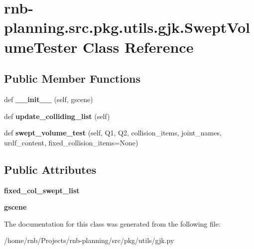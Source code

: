 \hypertarget{classrnb-planning_1_1src_1_1pkg_1_1utils_1_1gjk_1_1_swept_volume_tester}{}\section{rnb-\/planning.src.\+pkg.\+utils.\+gjk.\+Swept\+Volume\+Tester Class Reference}
\label{classrnb-planning_1_1src_1_1pkg_1_1utils_1_1gjk_1_1_swept_volume_tester}
\subsection*{Public Member Functions}
\begin{DoxyCompactItemize}
\item 
\mbox{\label{classrnb-planning_1_1src_1_1pkg_1_1utils_1_1gjk_1_1_swept_volume_tester_a6bcd39308ffeb36252c4067e192904e7}} 
def {\bfseries \+\_\+\+\_\+init\+\_\+\+\_\+} (self, gscene)
\item 
\mbox{\label{classrnb-planning_1_1src_1_1pkg_1_1utils_1_1gjk_1_1_swept_volume_tester_a9520fd8aa5183f2dc9afa0b8346349de}} 
def {\bfseries update\+\_\+colliding\+\_\+list} (self)
\item 
\mbox{\label{classrnb-planning_1_1src_1_1pkg_1_1utils_1_1gjk_1_1_swept_volume_tester_a3005e61846042c64531238e2b8476693}} 
def {\bfseries swept\+\_\+volume\+\_\+test} (self, Q1, Q2, collision\+\_\+items, joint\+\_\+names, urdf\+\_\+content, fixed\+\_\+collision\+\_\+items=None)
\end{DoxyCompactItemize}
\subsection*{Public Attributes}
\begin{DoxyCompactItemize}
\item 
\mbox{\label{classrnb-planning_1_1src_1_1pkg_1_1utils_1_1gjk_1_1_swept_volume_tester_a99333f9afc714ad6f7aecd1680269b8c}} 
{\bfseries fixed\+\_\+col\+\_\+swept\+\_\+list}
\item 
\mbox{\label{classrnb-planning_1_1src_1_1pkg_1_1utils_1_1gjk_1_1_swept_volume_tester_acb2387ea98d02eb1bb502fa585cbeb01}} 
{\bfseries gscene}
\end{DoxyCompactItemize}


The documentation for this class was generated from the following file\+:\begin{DoxyCompactItemize}
\item 
/home/rnb/\+Projects/rnb-\/planning/src/pkg/utils/gjk.\+py\end{DoxyCompactItemize}
